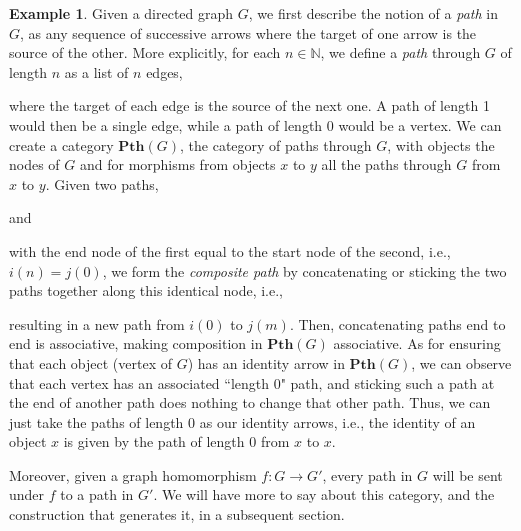 \documentclass[11pt]{book}
\theoremstyle{definition}
\newtheorem{example}{Example}[section]
\theoremstyle{definition}
\theoremstyle{definition}
\theoremstyle{theorem}
\theoremstyle{definition}
\begin{document}
\begin{example}
	Given a directed graph $G$, we first describe the notion of a \textit{path} in $G$, as any sequence of successive arrows where the target of one arrow is the source of the other. More explicitly, for each $n \in \mathbb{N}$, we define a \textit{path}  through $G$ of length $n$ as a list of $n$ edges, 
	\begin{center}
	\end{center}
	where the target of each edge is the source of the next one. A path of length 1 would then be a single edge, while a path of length 0 would be a vertex. We can create a category $\textbf{Pth}(G)$, the category of paths through $G$,  with objects the nodes of $G$ and for morphisms from objects $x$ to $y$ all the paths through $G$ from $x$ to $y$. Given two paths, 
	\begin{center}
\end{center}
and 
	\begin{center}
	\end{center} 
with the end node of the first equal to the start node of the second, i.e., $i(n) = j(0)$, we form the \textit{composite path} by concatenating or sticking the two paths together along this identical node, i.e., 
	\begin{center}
\end{center}
resulting in a new path from $i(0)$ to $j(m)$. Then, concatenating paths end to end is associative, making composition in $\textbf{Pth}(G)$ associative. As for ensuring that each object (vertex of $G$) has an identity arrow in $\textbf{Pth}(G)$, we can observe that each vertex has an associated ``length 0" path, and sticking such a path at the end of another path does nothing to change that other path. Thus, we can just take the paths of length 0 as our identity arrows, i.e., the identity of an object $x$ is given by the path of length 0 from $x$ to $x$. \par 
	 Moreover, given a graph homomorphism $f: G \rightarrow G'$, every path in $G$ will be sent under $f$ to a path in $G'$. We will have more to say about this category, and the construction that generates it, in a subsequent section. 
\end{example}
\end{document}

